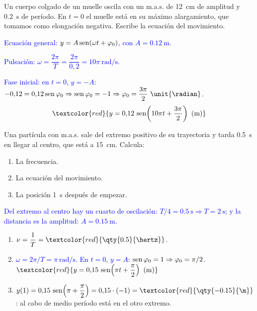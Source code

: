 \begin{exercise}
    Un cuerpo colgado de un muelle oscila con un m.a.s. de \qty{12}{\cm} de amplitud y \qty{0.2}{\second} de período. En
    \(t = 0\) el muelle está en su máximo alargamiento, que tomamos como elongación negativa. Escribe la ecuación del movimiento.
    \begin{solu}
        \textcolor{blue}{Ecuación general: \(y = A\operatorname{sen}(\omega t + \varphi_0)\), con \(A = \qty{0.12}{\m}\).}

        \textcolor{blue}{Pulsación: \(\omega = \dfrac{2\pi}{T} = \dfrac{2\pi}{0{,}2} = 10\pi\ \unit{\radian\per\second}\).}

        \textcolor{blue}{Fase inicial: en \(t = 0\), \(y = -A\): \(-0{,}12 = 0{,}12 \sen\varphi_0 \Rightarrow \sen\varphi_0 = -1
        \Rightarrow \varphi_0 = \dfrac{3\pi}{2}\ \unit{\radian}\).}
        \[ \textcolor{red}{y = 0{,}12\,\sen\!\left(10\pi t + \dfrac{3\pi}{2}\right)\ \text{(m)}} \]
    \end{solu}
\end{exercise}

\begin{exercise}
    Una partícula con m.a.s. sale del extremo positivo de su trayectoria y tarda \qty{0.5}{\second} en llegar al centro, que
    está a \qty{15}{\cm}. Calcula:
    \begin{enumerate}[label=\letraminuscula]
        \item La frecuencia.
        \item La ecuación del movimiento.
        \item La posición \qty{1}{\second} después de empezar.
    \end{enumerate}
    \begin{solu}
        \textcolor{blue}{Del extremo al centro hay un cuarto de oscilación: \(T/4 = \qty{0.5}{\second} \Rightarrow T = \qty{2}{\second}\);
        y la distancia es la amplitud: \(A = \qty{0.15}{\m}\).}
        \begin{enumerate}[label=\letraminuscula]
            \item \(\nu = \dfrac{1}{T} = \textcolor{red}{\qty{0.5}{\hertz}}\).
            \item \textcolor{blue}{\(\omega = 2\pi/T = \pi\ \unit{\radian\per\second}\). En \(t = 0\), \(y = A\): \(\operatorname{sen}\varphi_0 = 1 \Rightarrow \varphi_0 = \pi/2\).}
            \(\textcolor{red}{y = 0{,}15\,\sen\!\left(\pi t + \dfrac{\pi}{2}\right)\ \text{(m)}}\)
            \item \(y(1) = 0{,}15\,\sen\!\left(\pi + \dfrac{\pi}{2}\right) = 0{,}15\cdot(-1) = \textcolor{red}{\qty{-0.15}{\m}}\):
            al cabo de medio período está en el otro extremo.
        \end{enumerate}
    \end{solu}
\end{exercise}

